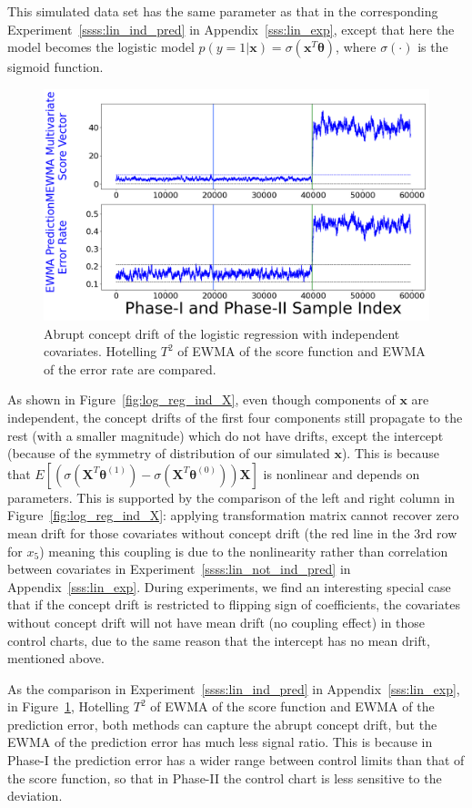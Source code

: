 \documentclass[twoside,11pt]{article}
\begin{document}
\begin{appendix}
\begin{enumerate}[(I)]
This simulated data set has the same parameter as that in the corresponding Experiment~\ref{ssss:lin_ind_pred} in Appendix~\ref{sss:lin_exp}, except that here the model becomes the {logistic model} {$p(y=1|\bm {x})= \sigma (\bm {x}^T\bm { \theta})$,} where $\sigma (\cdot)$ is the sigmoid function.
\begin{figure}[!htbp]
\centering
\includegraphics[width = 0.6\linewidth]{../figures/v14/sim_5/logi_no_muco/1_sim5_logi_1e-08_0_005_1.png}
  \caption{Abrupt concept drift of the logistic regression with independent covariates. Hotelling $T^2$ of EWMA of the score function and EWMA of the error rate are compared.}
  \label{fig:log_reg_ind_X_comp}
\end{figure}

As shown in Figure~\ref{fig:log_reg_ind_X}, even though components of $\bm {x}$ are independent, the concept drifts of the first four components still propagate to the rest (with a smaller magnitude) which do not have drifts, except the intercept (because of the symmetry of distribution of our simulated $\bm {x}$). This is because that $E [ (\sigma ( \bm {X}^T\bm { \theta}^{(1)} ) - \sigma ( \bm {X}^T\bm { \theta}^{(0)} )) \bm {X}] $ is nonlinear and depends on parameters. This is supported by the comparison of the left and right column in Figure~\ref{fig:log_reg_ind_X}: applying transformation matrix cannot recover zero mean drift for those covariates without concept drift (the red line in the $3$rd row for $x_5$) meaning this coupling is due to the nonlinearity rather than correlation between covariates in Experiment~\ref{ssss:lin_not_ind_pred} in Appendix~\ref{sss:lin_exp}. During experiments, we find an interesting special case that if the concept drift is restricted to flipping sign of coefficients, the covariates without concept drift will not have mean {drift} (no coupling effect) in those control charts, due to the same reason that the intercept has no mean drift, mentioned above.

As the comparison in Experiment~\ref{ssss:lin_ind_pred} in Appendix~\ref{sss:lin_exp}, in Figure~\ref{fig:log_reg_ind_X_comp}, Hotelling $T^2$ of EWMA of the score function and EWMA of the prediction error, both methods can capture the abrupt concept drift, but the EWMA of the prediction error has much less signal ratio. This is because in Phase-I the prediction error has a wider range between control limits than that of the score function, so that in Phase-II the control chart is less sensitive to the deviation.


\end{enumerate}
\end{appendix}
\end{document}
